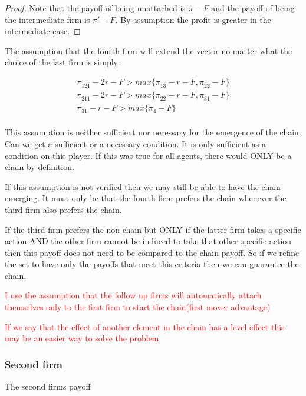 \documentclass{article}
\begin{document}
\begin{proof}
Note that the payoff of being unattached is $\pi-F$ and the payoff of being the intermediate firm is $\pi '-F$. By assumption the profit is greater in the intermediate case. 
\end{proof}

The assumption that the fourth firm will extend the vector no matter what the choice of the last firm is simply: 

\begin{align*}
\pi_{1 2 \overline{1}}-2r-F> max\{ \pi_{1 \overline{3} }-r-F, \pi_{ \overline{2}2 } -F  \} \\
\pi_{ 2 1 \overline{1}}-2r-F> max\{ \pi_{2 \overline{2} }-r-F, \pi_{ \overline{3} 1 }-F  \} \\
\pi_{ 3 \overline{1}}-r-F > max\{ \pi_{ \overline{4} }-F  \} \\
\end{align*}

This assumption is neither sufficient nor necessary for the emergence of the chain. Can we get a sufficient or a necessary condition. It is only sufficient as a condition on this player. If this was true for all agents, there would ONLY be a chain by definition. 

If this assumption is not verified then we may still be able to have the chain emerging. It must only be that the fourth firm prefers the chain whenever the third firm also prefers the chain. 

If the third firm prefers the non chain but ONLY if the latter firm takes a specific action AND the other firm cannot be induced to take that other specific action then this payoff does not need to be compared to the chain payoff. So if we refine the set to have only the payoffs that meet this criteria then we can guarantee the chain. 

\textcolor{red}{I use the assumption that the follow up firms will automatically attach themselves only to the first firm to start the chain(first mover advantage)}

\textcolor{red}{If we say that the effect of another element in the chain has a level effect this may be an easier way to solve the problem}


\subsubsection{Second firm}


The second firms payoff 
\end{document}
